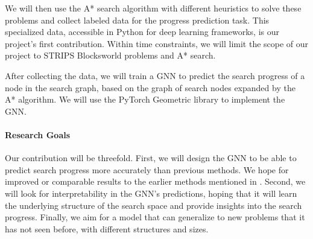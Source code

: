 \documentclass[12pt]{article}
\begin{document}
We will then use the A* search algorithm with different heuristics to solve these problems and collect labeled data for the progress prediction task. This specialized data, accessible in Python for deep learning frameworks, is our project's first contribution. Within time constraints, we will limit the scope of our project to STRIPS Blocksworld problems \citep{strips1971} and A* search.

After collecting the data, we will train a GNN to predict the search progress of a node in the search graph, based on the graph of search nodes expanded by the A* algorithm. We will use the PyTorch Geometric library to implement the GNN.

\paragraph{Research Goals} Our contribution will be threefold. First, we will design the GNN to be able to predict search progress more accurately than previous methods. We hope for improved or comparable results to the earlier methods mentioned in \citet{sudry2022learning}. Second, we will look for interpretability in the GNN's predictions, hoping that it will learn the underlying structure of the search space and provide insights into the search progress. Finally, we aim for a model that can generalize to new problems that it has not seen before, with different structures and sizes.




\end{document}
